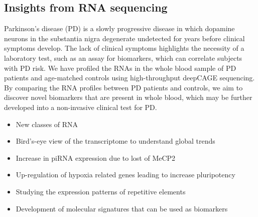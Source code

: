 \subsection{Insights from RNA sequencing}

Parkinson’s disease (PD) is a slowly progressive disease in which dopamine neurons in the substantia nigra degenerate undetected for years before clinical symptoms develop. The lack of clinical symptoms highlights the necessity of a laboratory test, such as an assay for biomarkers, which can correlate subjects with PD risk. We have profiled the RNAs in the whole blood sample of PD patients and age-matched controls using high-throughput deepCAGE sequencing. By comparing the RNA profiles between PD patients and controls, we aim to discover novel biomarkers that are present in whole blood, which may be further developed into a non-invasive clinical test for PD.

\begin{itemize}
   \item New classes of RNA
   \item Bird’s-eye view of the transcriptome to understand global trends
   \item Increase in piRNA expression due to lost of MeCP2
   \item Up-regulation of hypoxia related genes leading to increase pluripotency
   \item Studying the expression patterns of repetitive elements
   \item Development of molecular signatures that can be used as biomarkers
\end{itemize}

